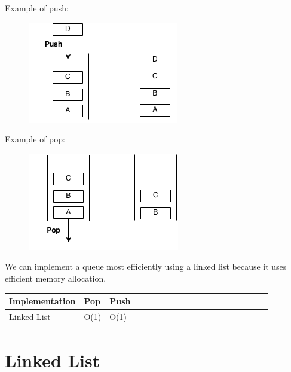 \documentclass[11pt,oneside]{book}
\makeatletter
\def\maxwidth#1{\ifdim\Gin@nat@width>#1 #1\else\Gin@nat@width\fi}
\makeatother
\begin{document}
Example of push:

\vspace{5px}\begin{figure}[H]\centering
        \includegraphics[width=0.66\maxwidth{\textwidth}]{queue.png}
        \end{figure}

Example of pop:

\vspace{5px}\begin{figure}[H]\centering
        \includegraphics[width=0.66\maxwidth{\textwidth}]{queue2.png}
        \end{figure}


        

We can implement a queue most efficiently using a linked list because it uses efficient memory allocation.

\begin{center}\begin{tabulary}{0.4\linewidth}{|l|l|l|l|l|l|l|l|l|l|l|l|l|l|l|l|l|l|l}\hline


  Implementation &
  Pop &
  Push\\
\hline


  Linked List &
  O(1) &
  O(1)\\

\hline\end{tabulary}\end{center}


        \section{ Linked List }
        
\end{document}
